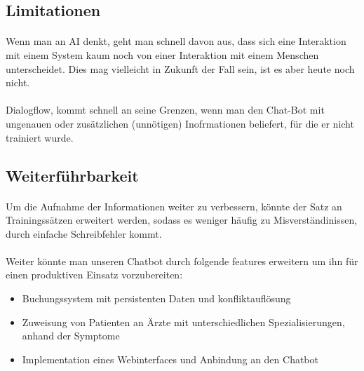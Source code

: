 \documentclass[11pt, letterpaper]{article}
\begin{document}
    \subsection{Limitationen}
        \paragraph{}
            Wenn man an AI denkt, geht man schnell davon aus, dass sich eine Interaktion mit einem System kaum noch von einer Interaktion mit einem
            Menschen unterscheidet. Dies mag vielleicht in Zukunft der Fall sein, ist es aber heute noch nicht. 
        \paragraph{}
            Dialogflow, kommt schnell an seine Grenzen, wenn man den Chat-Bot mit ungenauen oder zusätzlichen (unnötigen) Inofrmationen beliefert,
            für die er nicht trainiert wurde. 
    \subsection{Weiterführbarkeit}
        \paragraph{}
            Um die Aufnahme der Informationen weiter zu verbessern, könnte der Satz an Trainingssätzen erweitert werden, sodass es weniger häufig
            zu Misverständinissen, durch einfache Schreibfehler kommt.
        \paragraph{}
            Weiter könnte man unseren Chatbot durch folgende features erweitern um ihn für einen produktiven Einsatz vorzubereiten:
            \begin{itemize}
                \item Buchungssystem mit persistenten Daten und konfliktauflösung
                \item Zuweisung von Patienten an Ärzte mit unterschiedlichen Spezialisierungen, anhand der Symptome
                \item Implementation eines Webinterfaces und Anbindung an den Chatbot
            \end{itemize}
\end{document}
